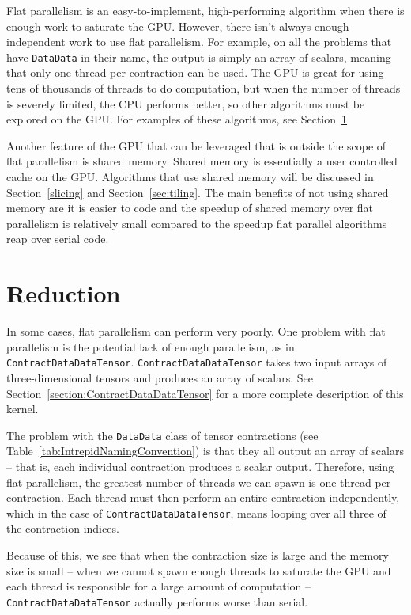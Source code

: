 Flat parallelism is an easy-to-implement, high-performing algorithm when there is 
enough work to saturate the GPU. However, there isn't always enough independent work to 
use flat parallelism. For example, on all the problems that have \texttt{DataData}
in their name, the output is simply an array of scalars, meaning that only one
thread per contraction can be used. The GPU is great for using tens of
thousands of threads to do computation, but when the number of threads is
severely limited, the CPU performs better, so other algorithms must be explored on the GPU. 
For examples of these algorithms, see Section~\ref{sec:reduction}

Another feature of the GPU that can be leveraged that is outside the scope of
flat parallelism is shared memory. Shared memory is essentially a user controlled cache
on the GPU. Algorithms that use shared memory will be discussed in
Section~\ref{slicing} and Section~\ref{sec:tiling}. The main benefits of not
using shared memory are it is easier to code and the speedup of shared memory over flat parallelism 
is relatively small compared to the speedup flat parallel algorithms reap over
serial code. 

\section{Reduction} \label{sec:reduction}
In some cases, flat parallelism can perform very poorly.  One problem with flat
parallelism is the potential lack of enough parallelism, as in
\texttt{ContractDataDataTensor}.  \texttt{ContractDataDataTensor} takes two
input arrays of three-dimensional tensors and produces an array of scalars.  See
Section~\ref{section:ContractDataDataTensor} for a more complete description of
this kernel.

The problem with the \texttt{DataData} class of tensor contractions (see
Table~\ref{tab:IntrepidNamingConvention}) is that they all output an array of
scalars -- that is, each individual contraction produces a scalar output.
Therefore, using flat parallelism, the greatest number of threads we can spawn
is one thread per contraction.  Each thread must then perform an entire
contraction independently, which in the case of
\texttt{ContractDataDataTensor}, means looping over all three of the
contraction indices.

Because of this, we see that when the contraction size is large and the memory
size is small -- when we cannot spawn enough threads to saturate the GPU and
each thread is responsible for a large amount of computation --
\texttt{ContractDataDataTensor} actually performs worse than serial.


